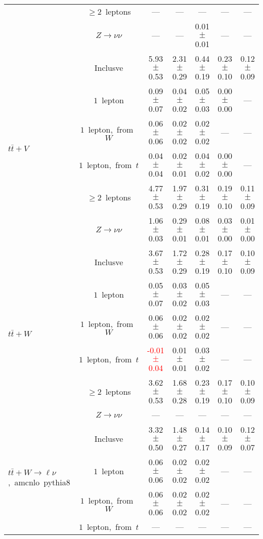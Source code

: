 \documentclass{article}
\begin{document}
\begin{longtable}{|l|c|c|c|c|c|c|}
 & $\ge2$~leptons  & ---  & ---  & ---  & ---  & --- \\* 
 & $Z\rightarrow\nu\nu$  & ---  & ---  & 0.01 $\pm$ 0.01  & ---  & --- \\* 
\hline 
\multirow{6}{*}{$t\bar{t}+V$} & Inclusve  & 5.93 $\pm$ 0.53  & 2.31 $\pm$ 0.29  & 0.44 $\pm$ 0.19  & 0.23 $\pm$ 0.10  & 0.12 $\pm$ 0.09 \\* 
 & $1$~lepton  & 0.09 $\pm$ 0.07  & 0.04 $\pm$ 0.02  & 0.05 $\pm$ 0.03  & 0.00 $\pm$ 0.00  & --- \\* 
 & $1$~lepton,~from~$W$  & 0.06 $\pm$ 0.06  & 0.02 $\pm$ 0.02  & 0.02 $\pm$ 0.02  & ---  & --- \\* 
 & $1$~lepton,~from~$t$  & 0.04 $\pm$ 0.04  & 0.02 $\pm$ 0.01  & 0.04 $\pm$ 0.02  & 0.00 $\pm$ 0.00  & --- \\* 
 & $\ge2$~leptons  & 4.77 $\pm$ 0.53  & 1.97 $\pm$ 0.29  & 0.31 $\pm$ 0.19  & 0.19 $\pm$ 0.10  & 0.11 $\pm$ 0.09 \\* 
 & $Z\rightarrow\nu\nu$  & 1.06 $\pm$ 0.03  & 0.29 $\pm$ 0.01  & 0.08 $\pm$ 0.01  & 0.03 $\pm$ 0.00  & 0.01 $\pm$ 0.00 \\* 
\hline 
\multirow{6}{*}{$t\bar{t}+W$} & Inclusve  & 3.67 $\pm$ 0.53  & 1.72 $\pm$ 0.29  & 0.28 $\pm$ 0.19  & 0.17 $\pm$ 0.10  & 0.10 $\pm$ 0.09 \\* 
 & $1$~lepton  & 0.05 $\pm$ 0.07  & 0.03 $\pm$ 0.02  & 0.05 $\pm$ 0.03  & ---  & --- \\* 
 & $1$~lepton,~from~$W$  & 0.06 $\pm$ 0.06  & 0.02 $\pm$ 0.02  & 0.02 $\pm$ 0.02  & ---  & --- \\* 
 & $1$~lepton,~from~$t$  & \textcolor{red}{ -0.01 $\pm$ 0.04 }  & 0.01 $\pm$ 0.01  & 0.03 $\pm$ 0.02  & ---  & --- \\* 
 & $\ge2$~leptons  & 3.62 $\pm$ 0.53  & 1.68 $\pm$ 0.28  & 0.23 $\pm$ 0.19  & 0.17 $\pm$ 0.10  & 0.10 $\pm$ 0.09 \\* 
 & $Z\rightarrow\nu\nu$  & ---  & ---  & ---  & ---  & --- \\* 
\hline 
\multirow{6}{*}{$t\bar{t}+W{\rightarrow}{\ell}{\nu}$,~amcnlo~pythia8} & Inclusve  & 3.32 $\pm$ 0.50  & 1.48 $\pm$ 0.27  & 0.14 $\pm$ 0.17  & 0.10 $\pm$ 0.09  & 0.12 $\pm$ 0.07 \\* 
 & $1$~lepton  & 0.06 $\pm$ 0.06  & 0.02 $\pm$ 0.02  & 0.02 $\pm$ 0.02  & ---  & --- \\* 
 & $1$~lepton,~from~$W$  & 0.06 $\pm$ 0.06  & 0.02 $\pm$ 0.02  & 0.02 $\pm$ 0.02  & ---  & --- \\* 
 & $1$~lepton,~from~$t$  & ---  & ---  & ---  & ---  & --- \\* 

\end{longtable}
\end{document}

